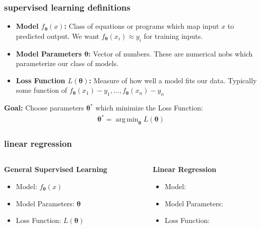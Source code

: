 \documentclass[handout,compress]{beamer}
\newcommand{\bs}[1]{\boldsymbol{#1}}
\DeclareMathOperator*{\argmin}{arg\,min}
\begin{document}
\begin{frame}
		\frametitle{supervised learning definitions}
		\small
		\begin{itemize}
			\item \textbf{\alert{Model} $f_{\bs{\theta}}(x)$:} Class of equations or programs which map input $x$ to predicted output. We want $f_{\bs{\theta}}(x_i) \approx y_i$ for training inputs. 
			\item \textbf{\alert{Model Parameters} $\bs{\theta}$:} Vector of numbers. These are numerical nobs which parameterize our class of models.
			\item \textbf{\alert{Loss Function} $L(\bs{\theta})$:} Measure of how well a model fits our data. Typically some function of $f_{\bs{\theta}}(x_1) - y_1, \ldots, f_{\bs{\theta}}(x_n) - y_n$
		\end{itemize}
		\begin{center}
			\textbf{Goal:} Choose parameters $\bs{\theta}^*$ which minimize the Loss Function:
			\begin{align*}
			 	\bs{\theta}^* = \argmin_{\bs{\theta}} L(\bs{\theta})
			\end{align*}
		\end{center}
\end{frame}

\begin{frame}
	\frametitle{linear regression}
	\begin{columns}
		\begin{column}{.5\textwidth}
			\begin{center}
				\textbf{General Supervised Learning}
			\end{center}
			
			\begin{itemize}
				\item Model: $f_{\bs{\theta}}(x)$
				\vspace{4em}
				\item Model Parameters: $\bs{\theta}$
				\vspace{4em}
				\item Loss Function: $L(\bs{\theta})$
				\vspace{4em}
			\end{itemize}
		\end{column}
		\begin{column}{.5\textwidth}
			\begin{center}
				\textbf{Linear Regression}
			\end{center}
			
			\begin{itemize}
				\item Model: 
				\vspace{4em}
				\item Model Parameters: 
				\vspace{4em}
				\item Loss Function:
				\vspace{4em}
			\end{itemize}
		\end{column}
	\end{columns}
\end{frame}
\end{document}
